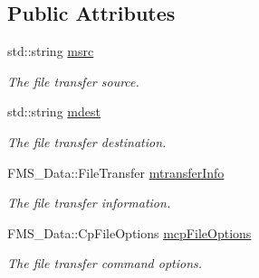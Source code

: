 \subsection*{Public Attributes}
\begin{DoxyCompactItemize}
\item 
\hypertarget{structTransferAsyncFunc_a08046235167d1089c6cf1ea97bbe4f40}{
std::string \hyperlink{structTransferAsyncFunc_a08046235167d1089c6cf1ea97bbe4f40}{msrc}}
\label{structTransferAsyncFunc_a08046235167d1089c6cf1ea97bbe4f40}

\begin{DoxyCompactList}\small\item\em The file transfer source. \item\end{DoxyCompactList}\item 
\hypertarget{structTransferAsyncFunc_a00aa188a4180ab61de23cc1282b29737}{
std::string \hyperlink{structTransferAsyncFunc_a00aa188a4180ab61de23cc1282b29737}{mdest}}
\label{structTransferAsyncFunc_a00aa188a4180ab61de23cc1282b29737}

\begin{DoxyCompactList}\small\item\em The file transfer destination. \item\end{DoxyCompactList}\item 
\hypertarget{structTransferAsyncFunc_ac23f2de616b8cae5d74dcc76eb23e2da}{
FMS\_\-Data::FileTransfer \hyperlink{structTransferAsyncFunc_ac23f2de616b8cae5d74dcc76eb23e2da}{mtransferInfo}}
\label{structTransferAsyncFunc_ac23f2de616b8cae5d74dcc76eb23e2da}

\begin{DoxyCompactList}\small\item\em The file transfer information. \item\end{DoxyCompactList}\item 
\hypertarget{structTransferAsyncFunc_a4187ac49712a88ac99a68bd1fe9b33bd}{
FMS\_\-Data::CpFileOptions \hyperlink{structTransferAsyncFunc_a4187ac49712a88ac99a68bd1fe9b33bd}{mcpFileOptions}}
\label{structTransferAsyncFunc_a4187ac49712a88ac99a68bd1fe9b33bd}

\begin{DoxyCompactList}\small\item\em The file transfer command options. \item\end{DoxyCompactList}\end{DoxyCompactItemize}


